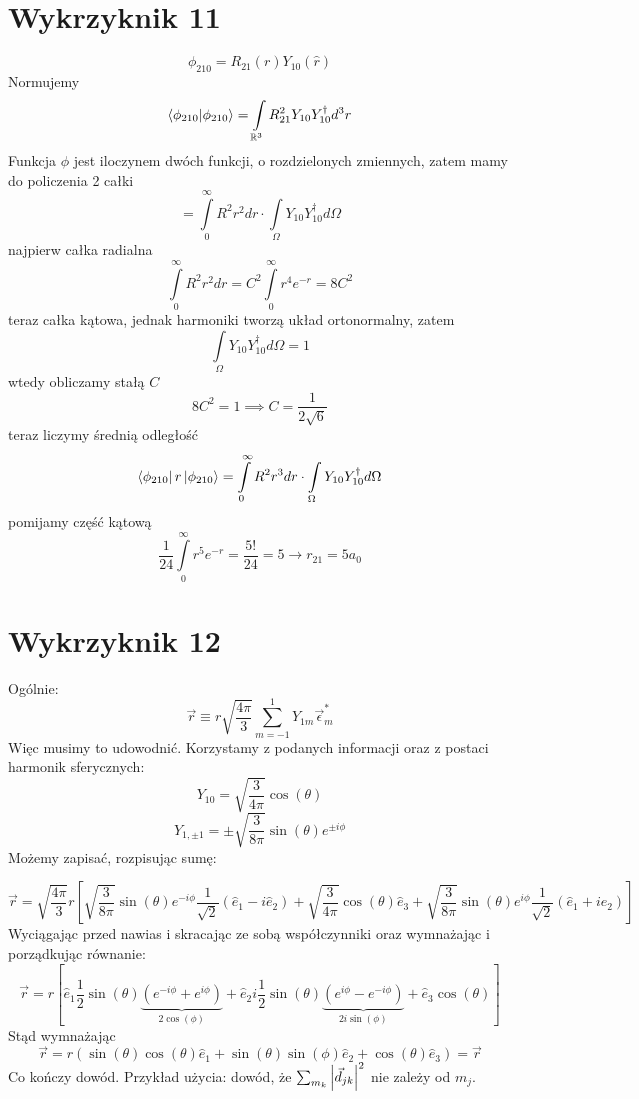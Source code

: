 \documentclass[a4paper,12pt]{article}
\begin{document}
\section{Wykrzyknik 11}
$$
	\phi_{210} = R_{21}(r) Y_{10}(\hat{r})
$$
Normujemy
$$
	\braket{\phi_{210}}{\phi_{210}} = \int\limits_{\mathbb{R}^3} R_{21}^2 Y_{10} Y_{10}^\dagger d^3r
$$
Funkcja $\phi$ jest iloczynem dwóch funkcji, o rozdzielonych zmiennych, zatem mamy do policzenia 2 całki
$$
	= \int\limits_0^{\infty}R^2 r^2 dr \cdot \int\limits_{\Omega} Y_{10} Y_{10}^\dagger d\Omega
$$
najpierw całka radialna
$$
	\int\limits_0^{\infty}R^2 r^2 dr  = C^2\int\limits_0^{\infty}r^4 e^{-r} = 8C^2
$$
teraz całka kątowa, jednak harmoniki tworzą układ ortonormalny, zatem
$$
	\int\limits_{\Omega} Y_{10} Y_{10}^\dagger d\Omega = 1
$$
wtedy obliczamy stałą $C$
$$
	8C^2 = 1 \implies C= \frac{1}{2\sqrt{6}}
$$
teraz liczymy średnią odległość
$$
	\bra{\phi_{210}}r\ket{\phi_{210}} = \int\limits_0^{\infty}R^2 r^3 dr \cdot \int\limits_{\Omega} Y_{10} Y_{10}^\dagger d\Omega
$$
pomijamy część kątową
$$
	\frac{1}{24}\int\limits_0^{\infty}r^5 e^{-r} = \frac{5!}{24} = 5 \to r_{21} = 5a_0
$$

\section{Wykrzyknik 12}
Ogólnie:
\[
  \vec{r} \equiv  r \sqrt{\frac{4\pi}{3}}\sum_{m=-1}^{1} Y_{1m}
  \vec{\epsilon}_m^*
\]
Więc musimy to udowodnić. Korzystamy z podanych informacji oraz z postaci
harmonik sferycznych:
\[
  Y_{10} = \sqrt{\frac{3}{4\pi}} \cos(\theta)
\]
\[
  Y_{1, \pm 1} = \pm \sqrt{\frac{3}{8\pi}} \sin(\theta) e^{\pm i \phi}
\]
Możemy zapisać, rozpisując sumę:

\begin{equation*}
    \vec{r}  = \sqrt{\frac{4\pi}{3}} r \left[
    \sqrt{\frac{3}{8\pi}}\sin(\theta)e^{-i\phi}\frac{1}{\sqrt{2}} \left(
    \hat{e}_1 - i\hat{e}_2 \right) + \sqrt{\frac{3}{4\pi}}\cos(\theta)\hat{e}_3 +
    \sqrt{\frac{3}{8\pi}}\sin(\theta)e^{i\phi} \frac{1}{\sqrt{2}}\left(\hat{e}_1 +
  i\hat{e}_2 \right) \right]
\end{equation*}
Wyciągając przed nawias i skracając ze sobą współczynniki  oraz wymnażając i
porządkując równanie:
\begin{equation*}
  \vec{r} = r \left[ \hat{e}_1 \frac{1}{2} \sin(\theta) \underbrace{\left( e^{-i\phi} +
    e^{i\phi} \right)}_{2\cos(\phi)} + \hat{e}_2 i \frac{1}{2}\sin(\theta)
    \underbrace{\left( e^{i\phi} - e^{-i\phi} \right)}_{2i\sin(\phi)} +
  \hat{e}_3 \cos(\theta)\right]
\end{equation*}
Stąd wymnażając
\begin{equation*}
  \vec{r} = r\left( \sin(\theta) \cos(\theta) \hat{e}_1 + \sin(\theta)
  \sin(\phi) \hat{e}_2 + \cos(\theta) \hat{e}_3 \right) = \vec{r}
\end{equation*}
Co kończy dowód. Przykład użycia: dowód, że $\sum_{m_k} \abs{\vec{d}_{jk}}^2$ nie
zależy od $m_j$.
\end{document}
